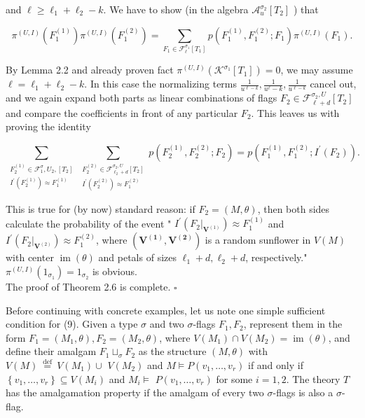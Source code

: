 \documentclass[10pt]{article}
\begin{document}
and $\ell \geq \ell_{1}+\ell_{2}-k$. We have to show (in the algebra $\mathcal{A}_{u}^{\sigma_{2}}\left[T_{2}\right]$ ) that

$$
\pi^{(U, I)}\left(F_{1}^{(1)}\right) \pi^{(U, I)}\left(F_{1}^{(2)}\right)=\sum_{F_{1} \in \mathcal{F}_{\ell}^{\sigma_{1}}\left[T_{1}\right]} p\left(F_{1}^{(1)}, F_{1}^{(2)} ; F_{1}\right) \pi^{(U, I)}\left(F_{1}\right) .
$$

By Lemma 2.2 and already proven fact $\pi^{(U, I)}\left(\mathcal{K}^{\sigma_{1}}\left[T_{1}\right]\right)=0$, we may assume $\ell=\ell_{1}+\ell_{2}-k$. In this case the normalizing terms $\frac{1}{u^{\ell-k}}, \frac{1}{u^{\ell}-k}, \frac{1}{u^{\ell-k}}$ cancel out, and we again expand both parts as linear combinations of flags $F_{2} \in \mathcal{F}_{\ell+d}^{\sigma_{2}, U}\left[T_{2}\right]$ and compare the coefficients in front of any particular $F_{2}$. This leaves us with proving the identity

$$
\sum_{\substack{F_{2}^{(1)} \in \mathcal{F}_{1}^{\sigma}, U_{2},\left[T_{2}\right] \\ I^{\prime}\left(F_{2}^{(1)}\right) \approx F_{1}^{(1)}}} \sum_{\substack{F_{2}^{(2)} \in \mathcal{F}_{\ell_{2}+d}^{\sigma_{2}, U}\left[T_{2}\right] \\ I^{\prime}\left(F_{2}^{(2)}\right) \approx F_{1}^{(2)}}} p\left(F_{2}^{(1)}, F_{2}^{(2)} ; F_{2}\right)=p\left(F_{1}^{(1)}, F_{1}^{(2)} ; I^{\prime}\left(F_{2}\right)\right) .
$$

This is true for (by now) standard reason: if $F_{2}=(M, \theta)$, then both sides calculate the probability of the event " $I^{\prime}\left(\left.F_{2}\right|_{\boldsymbol{V}^{(1)}}\right) \approx F_{1}^{(1)}$ and $I^{\prime}\left(\left.F_{2}\right|_{\boldsymbol{V}^{(2)}}\right) \approx F_{1}^{(2)}$, where $\left(\boldsymbol{V}^{(\mathbf{1})}, \boldsymbol{V}^{(\mathbf{2})}\right)$ is a random sunflower in $V(M)$ with center $\operatorname{im}(\theta)$ and petals of sizes $\ell_{1}+d, \ell_{2}+d$, respectively."\\
$\pi^{(U, I)}\left(1_{\sigma_{1}}\right)=1_{\sigma_{2}}$ is obvious.\\
The proof of Theorem 2.6 is complete. \(\square\)

Before continuing with concrete examples, let us note one simple sufficient condition for (9). Given a type $\sigma$ and two $\sigma$-flags $F_{1}, F_{2}$, represent them in the form $F_{1}=\left(M_{1}, \theta\right), F_{2}=\left(M_{2}, \theta\right)$, where $V\left(M_{1}\right) \cap V\left(M_{2}\right)=\operatorname{im}(\theta)$, and define their amalgam $F_{1} \sqcup_{\sigma} F_{2}$ as the structure $(M, \theta)$ with $V(M) \stackrel{\text { def }}{=} V\left(M_{1}\right) \cup$ $V\left(M_{2}\right)$ and $M \models P\left(v_{1}, \ldots, v_{r}\right)$ if and only if $\left\{v_{1}, \ldots, v_{r}\right\} \subseteq V\left(M_{i}\right)$ and $M_{i} \models$ $P\left(v_{1}, \ldots, v_{r}\right)$ for some $i=1,2$. The theory $T$ has the amalgamation property if the amalgam of every two $\sigma$-flags is also a $\sigma$-flag.
\end{document}
